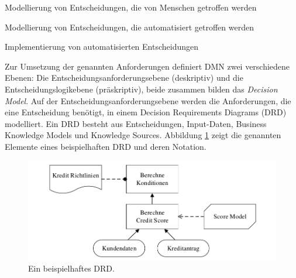 \begin{enumerate*}
\item Modellierung von Entscheidungen, die von Menschen getroffen werden
\item Modellierung von Entscheidungen, die automatisiert getroffen werden 
\item Implementierung von automatisierten Entscheidungen    
\end{enumerate*}

Zur Umsetzung der genannten Anforderungen definiert DMN zwei verschiedene Ebenen: Die Entscheidungsanforderungsebene (deskriptiv) und die Entscheidungslogikebene (präskriptiv), beide zusammen bilden das \emph{Decision Model}. Auf der Entscheidungsanforderungsebene werden die Anforderungen, die eine Entscheidung benötigt, in einem Decision Requirements Diagrams (DRD) modelliert. Ein DRD besteht aus Entscheidungen, Input-Daten, Business Knowledge Models und Knowledge Sources. Abbildung \ref{fig:drd} \cite[vgl. S. 21]{OM16} zeigt die genannten Elemente eines beispielhaften DRD und deren Notation.     

\begin{figure}[ht]
\centering
\includegraphics{images/drd.pdf}
\caption{Ein beispielhaftes DRD.}
\label{fig:drd}
\end{figure}

